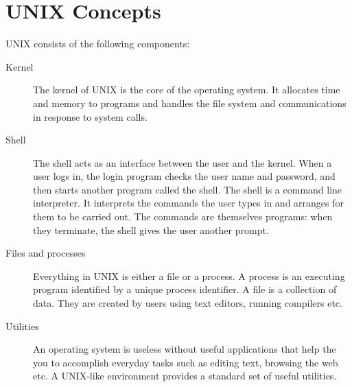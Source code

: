 \section{UNIX Concepts}
UNIX consists of the following components:
\begin{description}
\item[Kernel] The kernel of UNIX is the core of the operating system. It
allocates time and memory to programs and handles the file system and
communications in response to system calls.  
\item[Shell] The shell acts as an interface between the user and the kernel.
When a user logs in, the login program checks the user name and password, and
then starts another program called the shell.   The shell is a command line
interpreter. It interprets the commands the user types in and arranges for them
to be carried out. The commands are themselves programs: when they terminate,
the shell gives the user another prompt.  
\item[Files and processes] Everything in UNIX is either a file or a process.  A
process is an executing program identified by a unique process identifier.  A
file is a collection of data. They are created by users using text editors,
running compilers etc.
\item[Utilities] An operating system is useless without useful applications that
help the you to accomplish everyday tasks such as editing text, browsing the web
etc.  A UNIX-like environment provides a standard set of useful utilities.  
\end{description}

